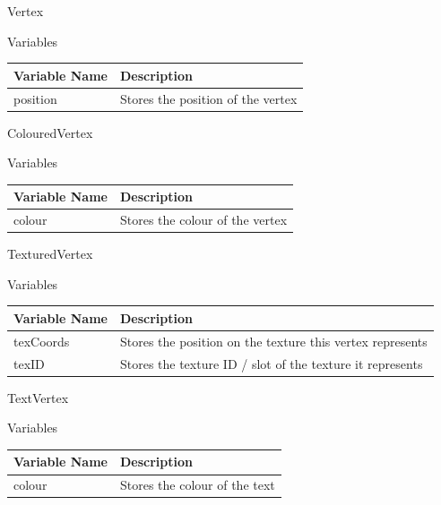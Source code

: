 \documentclass{article}
\begin{document}
                Vertex
                \begin{center}
                    Variables
                    \begin{tabular}{ | m{} | m{} | }
                        \hline
                        \textbf{Variable Name} & \textbf{Description} \\
                        \hline
                        position & Stores the position of the vertex \\
                        \hline
                    \end{tabular}
                \end{center}
                ColouredVertex
                \begin{center}
                    Variables
                    \begin{tabular}{ | m{} | m{} | }
                        \hline
                        \textbf{Variable Name} & \textbf{Description} \\
                        \hline
                        colour & Stores the colour of the vertex \\
                        \hline
                    \end{tabular}
                \end{center}
                TexturedVertex
                \begin{center}
                    Variables
                    \begin{tabular}{ | m{} | m{} | }
                        \hline
                        \textbf{Variable Name} & \textbf{Description} \\
                        \hline
                        texCoords & Stores the position on the texture this vertex represents \\
                        \hline
                        texID & Stores the texture ID / slot of the texture it represents \\
                        \hline
                    \end{tabular}
                \end{center}
                TextVertex
                \begin{center}
                    Variables
                    \begin{tabular}{ | m{} | m{} | }
                        \hline
                        \textbf{Variable Name} & \textbf{Description} \\
                        \hline
                        colour & Stores the colour of the text \\
                        \hline
                    \end{tabular}
                \end{center}
            \clearpage
\end{document}

